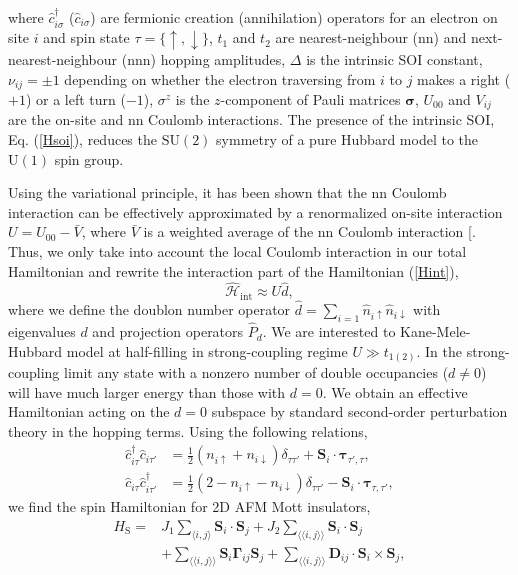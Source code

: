 \documentclass[aps,prl,twocolumn,amsmath,amssymb,nobibnotes]{revtex4-1}%
\renewcommand{\cite}[1]{{[}\onlinecite{#1}{]}}
\newcommand{\n}{\nonumber}
\newcommand{\bs}{\boldsymbol}
\begin{document}
where $\hat{c}_{i \sigma}^\dagger$ ($ \hat{c}_{i \sigma}$) are fermionic creation (annihilation) operators for an electron on site $i$ and spin state $\tau=\{\uparrow,\downarrow\}$, $t_1$ and $t_2$ are nearest-neighbour (nn) and  next-nearest-neighbour (nnn) hopping amplitudes, $\Delta$ is the intrinsic SOI constant, $\nu_{ij}=\pm 1$ depending on whether the electron traversing from $i$ to $j$ makes a right ($+1$) or a left turn ($-1$), $\sigma^{z}$ is the $z$-component of Pauli matrices $\bm{\sigma}$, $U_{00}$ and $V_{ij}$ are the on-site and nn Coulomb interactions.
The presence of the intrinsic SOI, Eq. (\ref{Hsoi}), reduces the $\mathrm{SU}(2)$ symmetry of a pure Hubbard model to the $\mathrm{U}(1)$ spin group.

Using the variational principle, it has been shown that the nn Coulomb interaction can be effectively approximated by a renormalized on-site interaction $U =U_{00} - \bar{V}$, where $\bar{V}$ is a weighted average of the nn Coulomb interaction \cite{Schuler2013,Stepanov2017}. Thus, we only take into account the local Coulomb interaction in our total Hamiltonian and rewrite the interaction part of the Hamiltonian (\ref{Hint}),
\begin{equation}
\hat{\mathcal{H}}_{\text{int}} \approx U\hat{d},
\end{equation}
where we define the doublon number operator $\hat{d} = \sum_{i=1} \hat{n}_{i\uparrow}\hat{n}_{i\downarrow}$ with eigenvalues $d$ and projection operators $\hat{P}_d$. We are interested to Kane-Mele-Hubbard model at half-filling in strong-coupling regime $U\gg t_{1(2)}$. In the strong-coupling limit any state with a nonzero number of double occupancies ($d \neq 0$) will have much larger energy than those with $d=0$. We obtain an effective Hamiltonian acting on the $d=0$ subspace by standard second-order perturbation theory in the hopping terms. Using the following relations,
\begin{align}
\hat{c}_{i \tau}^\dagger \hat{c}_{i \tau'} &= \frac{1}{2} (n_{i \uparrow} + n_{i \downarrow})\delta_{\tau \tau'}  + \bs{S}_i\cdot\bs{\tau}_{\tau', \tau}, \label{SpinOperatorInv1}\\
\hat{c}_{i \tau} \hat{c}_{i \tau'}^\dagger &= \frac{1}{2} (2 - n_{i \uparrow} - n_{i \downarrow}) \delta_{\tau \tau'} - \bs{S}_i\cdot\bs{\tau}_{\tau, \tau'}, \label{SpinOperatorInv2}
\end{align}
we find the spin Hamiltonian for 2D AFM Mott insulators,
\begin{align}
\label{MKMHeff0}
H_{\text{S}} =& J_{1}\sum_{\langle i,j \rangle} \bs{S}_i\cdot\bs{S}_j + J_{2}\sum_{\langle \langle i,j \rangle \rangle} \bs{S}_i\cdot\bs{S}_j\n \\
&+ \sum_{\langle \langle i,j \rangle \rangle} \bs{S}_i \bs{\Gamma}_{ij} \bs{S}_j +\sum_{\langle \langle i,j \rangle \rangle} \bs{D}_{ij}\cdot \bs{S}_i \times \bs{S}_j,
\end{align}
\end{document}
